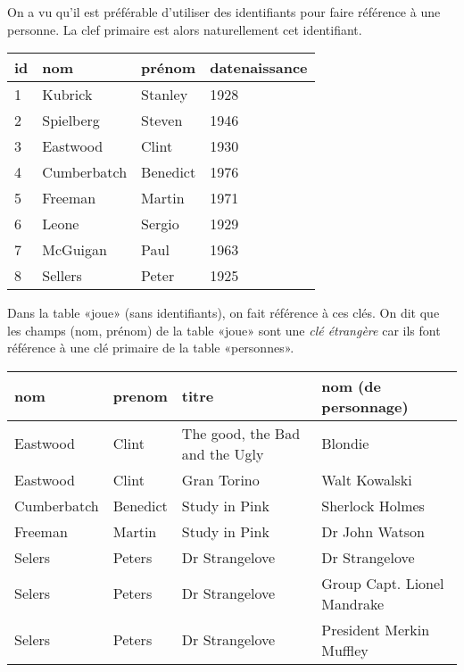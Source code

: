 
On a vu qu'il est préférable d'utiliser des identifiants pour faire référence à une personne. La clef primaire est alors naturellement cet identifiant. 

\begin{center}
\begin{tabular}{llll}
\toprule
id & nom & prénom & datenaissance\\
\midrule
1&Kubrick&Stanley&1928\\
2&Spielberg & Steven& 1946\\
3&Eastwood & Clint& 1930\\
4&Cumberbatch & Benedict & 1976\\
5&Freeman & Martin& 1971\\
6&Leone & Sergio & 1929 \\
7&McGuigan & Paul & 1963\\
8&Sellers&Peter&1925\\
\bottomrule
\end{tabular}
\end{center}

Dans la table «joue» (sans identifiants), on fait référence à ces clés.
On dit que les champs (nom, prénom) de la table «joue» sont une \emph{clé
étrangère} car ils font référence à une clé primaire de la table
«personnes».

\begin{center}
  \begin{tabular}{llll}
    \toprule
    nom & prenom & titre & nom (de personnage)\\
    \midrule
    Eastwood & Clint & {\tiny The good, the Bad and the Ugly}& Blondie\\
    Eastwood & Clint & Gran Torino& Walt Kowalski\\
    Cumberbatch&Benedict&Study in Pink& Sherlock Holmes\\
    Freeman & Martin&Study in Pink&Dr John Watson\\
    Selers & Peters&Dr Strangelove&Dr Strangelove\\
    Selers & Peters&Dr Strangelove&{\tiny Group Capt. Lionel Mandrake}\\
    Selers & Peters&Dr Strangelove&{\small President Merkin Muffley}\\
\bottomrule
  \end{tabular}
\end{center}


